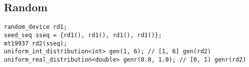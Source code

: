\documentclass[landscape, 8pt, a4paper, oneside, twocolumn]{extarticle}
\begin{document}
\subsection{Random}
\begin{verbatim}
random_device rd1;
seed_seq sseq = {rd1(), rd1(), rd1(), rd1()};
mt19937 rd2(sseq);
uniform_int_distribution<int> gen(1, 6); // [1, 6] gen(rd2)
uniform_real_distribution<double> genr(0.0, 1.0); // [0, 1) genr(rd2)
\end{verbatim}
\end{document}
